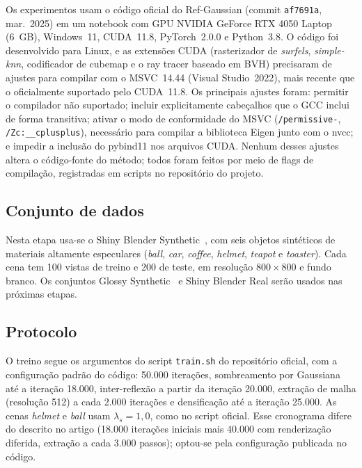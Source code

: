 \documentclass[conference]{IEEEtran}
\begin{document}
Os experimentos usam o código oficial do Ref-Gaussian (commit \texttt{af7691a}, mar.~2025) em um notebook com GPU NVIDIA GeForce RTX 4050 Laptop (6~GB), Windows~11, CUDA~11.8, PyTorch~2.0.0 e Python~3.8. O código foi desenvolvido para Linux, e as extensões CUDA (rasterizador de \textit{surfels}, \textit{simple-knn}, codificador de cubemap e o ray tracer baseado em BVH) precisaram de ajustes para compilar com o MSVC~14.44 (Visual Studio~2022), mais recente que o oficialmente suportado pelo CUDA~11.8. Os principais ajustes foram: permitir o compilador não suportado; incluir explicitamente cabeçalhos que o GCC inclui de forma transitiva; ativar o modo de conformidade do MSVC (\texttt{/permissive-}, \texttt{/Zc:\_\_cplusplus}), necessário para compilar a biblioteca Eigen junto com o nvcc; e impedir a inclusão do pybind11 nos arquivos CUDA. Nenhum desses ajustes altera o código-fonte do método; todos foram feitos por meio de flags de compilação, registradas em scripts no repositório do projeto.

\subsection{Conjunto de dados}

Nesta etapa usa-se o Shiny Blender Synthetic~\cite{verbin2022refnerf}, com seis objetos sintéticos de materiais altamente especulares (\textit{ball}, \textit{car}, \textit{coffee}, \textit{helmet}, \textit{teapot} e \textit{toaster}). Cada cena tem 100 vistas de treino e 200 de teste, em resolução $800\times800$ e fundo branco. Os conjuntos Glossy Synthetic~\cite{liu2023nero} e Shiny Blender Real serão usados nas próximas etapas.

\subsection{Protocolo}

O treino segue os argumentos do script \texttt{train.sh} do repositório oficial, com a configuração padrão do código: 50.000 iterações, sombreamento por Gaussiana até a iteração 18.000, inter-reflexão a partir da iteração 20.000, extração de malha (resolução 512) a cada 2.000 iterações e densificação até a iteração 25.000. As cenas \textit{helmet} e \textit{ball} usam $\lambda_s=1{,}0$, como no script oficial. Esse cronograma difere do descrito no artigo (18.000 iterações iniciais mais 40.000 com renderização diferida, extração a cada 3.000 passos); optou-se pela configuração publicada no código.
\end{document}
